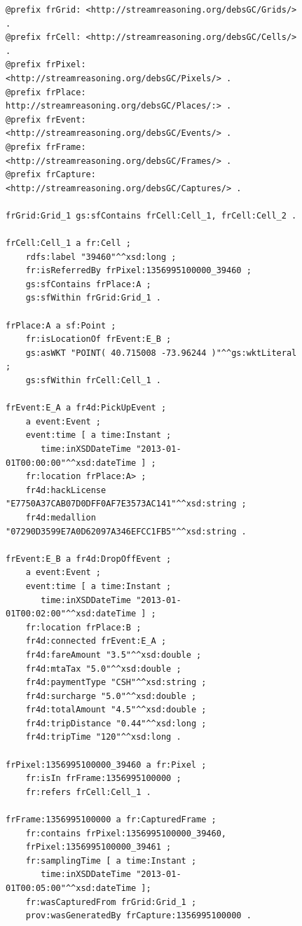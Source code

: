 \begin{figure}[p]
\begin{minipage}{0.95\linewidth}
\begin{lstlisting}[label={lst:debs}, caption={Fraction of the model representing ACM DEBS Grand Challenge 2015 Data}, style=N3]
@prefix frGrid: <http://streamreasoning.org/debsGC/Grids/> .
@prefix frCell: <http://streamreasoning.org/debsGC/Cells/> .
@prefix frPixel: <http://streamreasoning.org/debsGC/Pixels/> .
@prefix frPlace: http://streamreasoning.org/debsGC/Places/:> .
@prefix frEvent: <http://streamreasoning.org/debsGC/Events/> .
@prefix frFrame: <http://streamreasoning.org/debsGC/Frames/> .
@prefix frCapture: <http://streamreasoning.org/debsGC/Captures/> .

frGrid:Grid_1 gs:sfContains frCell:Cell_1, frCell:Cell_2 .

frCell:Cell_1 a fr:Cell ;
    rdfs:label "39460"^^xsd:long ;
    fr:isReferredBy frPixel:1356995100000_39460 ;
    gs:sfContains frPlace:A ;
    gs:sfWithin frGrid:Grid_1 .

frPlace:A a sf:Point ;
    fr:isLocationOf frEvent:E_B ;
    gs:asWKT "POINT( 40.715008 -73.96244 )"^^gs:wktLiteral ;
    gs:sfWithin frCell:Cell_1 .

frEvent:E_A a fr4d:PickUpEvent ; 
    a event:Event ;
    event:time [ a time:Instant ; 
       time:inXSDDateTime "2013-01-01T00:00:00"^^xsd:dateTime ] ;
    fr:location frPlace:A> ;
    fr4d:hackLicense "E7750A37CAB07D0DFF0AF7E3573AC141"^^xsd:string ;
    fr4d:medallion "07290D3599E7A0D62097A346EFCC1FB5"^^xsd:string .

frEvent:E_B a fr4d:DropOffEvent ; 
    a event:Event ;
    event:time [ a time:Instant ; 
       time:inXSDDateTime "2013-01-01T00:02:00"^^xsd:dateTime ] ;
    fr:location frPlace:B ;
    fr4d:connected frEvent:E_A ;
    fr4d:fareAmount "3.5"^^xsd:double ;
    fr4d:mtaTax "5.0"^^xsd:double ;
    fr4d:paymentType "CSH"^^xsd:string ;
    fr4d:surcharge "5.0"^^xsd:double ;
    fr4d:totalAmount "4.5"^^xsd:double ;
    fr4d:tripDistance "0.44"^^xsd:long ;
    fr4d:tripTime "120"^^xsd:long .

frPixel:1356995100000_39460 a fr:Pixel ;
    fr:isIn frFrame:1356995100000 ;
    fr:refers frCell:Cell_1 .

frFrame:1356995100000 a fr:CapturedFrame ;
    fr:contains frPixel:1356995100000_39460, 
    frPixel:1356995100000_39461 ;
    fr:samplingTime [ a time:Instant ; 
       time:inXSDDateTime "2013-01-01T00:05:00"^^xsd:dateTime ];
    fr:wasCapturedFrom frGrid:Grid_1 ;
    prov:wasGeneratedBy frCapture:1356995100000 .
\end{lstlisting}
\end{minipage}
\end{figure} 

